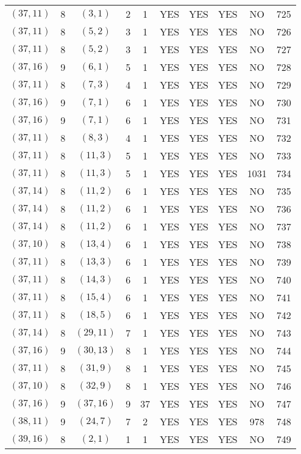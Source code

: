 \begin{longtable}{|c|c|c|c|c|c|c|c|c|c|}
$(37, 11)$ & 8 & $(3, 1)$ & 2 & 1 & YES & YES & YES & NO & 725\\
$(37, 11)$ & 8 & $(5, 2)$ & 3 & 1 & YES & YES & YES & NO & 726\\
$(37, 11)$ & 8 & $(5, 2)$ & 3 & 1 & YES & YES & YES & NO & 727\\
$(37, 16)$ & 9 & $(6, 1)$ & 5 & 1 & YES & YES & YES & NO & 728\\
$(37, 11)$ & 8 & $(7, 3)$ & 4 & 1 & YES & YES & YES & NO & 729\\
$(37, 16)$ & 9 & $(7, 1)$ & 6 & 1 & YES & YES & YES & NO & 730\\
$(37, 16)$ & 9 & $(7, 1)$ & 6 & 1 & YES & YES & YES & NO & 731\\
$(37, 11)$ & 8 & $(8, 3)$ & 4 & 1 & YES & YES & YES & NO & 732\\
$(37, 11)$ & 8 & $(11, 3)$ & 5 & 1 & YES & YES & YES & NO & 733\\
$(37, 11)$ & 8 & $(11, 3)$ & 5 & 1 & YES & YES & YES & 1031 & 734\\
$(37, 14)$ & 8 & $(11, 2)$ & 6 & 1 & YES & YES & YES & NO & 735\\
$(37, 14)$ & 8 & $(11, 2)$ & 6 & 1 & YES & YES & YES & NO & 736\\
$(37, 14)$ & 8 & $(11, 2)$ & 6 & 1 & YES & YES & YES & NO & 737\\
$(37, 10)$ & 8 & $(13, 4)$ & 6 & 1 & YES & YES & YES & NO & 738\\
$(37, 11)$ & 8 & $(13, 3)$ & 6 & 1 & YES & YES & YES & NO & 739\\
$(37, 11)$ & 8 & $(14, 3)$ & 6 & 1 & YES & YES & YES & NO & 740\\
$(37, 11)$ & 8 & $(15, 4)$ & 6 & 1 & YES & YES & YES & NO & 741\\
$(37, 11)$ & 8 & $(18, 5)$ & 6 & 1 & YES & YES & YES & NO & 742\\
$(37, 14)$ & 8 & $(29, 11)$ & 7 & 1 & YES & YES & YES & NO & 743\\
$(37, 16)$ & 9 & $(30, 13)$ & 8 & 1 & YES & YES & YES & NO & 744\\
$(37, 11)$ & 8 & $(31, 9)$ & 8 & 1 & YES & YES & YES & NO & 745\\
$(37, 10)$ & 8 & $(32, 9)$ & 8 & 1 & YES & YES & YES & NO & 746\\
$(37, 16)$ & 9 & $(37, 16)$ & 9 & 37 & YES & YES & YES & NO & 747\\
$(38, 11)$ & 9 & $(24, 7)$ & 7 & 2 & YES & YES & YES & 978 & 748\\
$(39, 16)$ & 8 & $(2, 1)$ & 1 & 1 & YES & YES & YES & NO & 749\\

\end{longtable}
